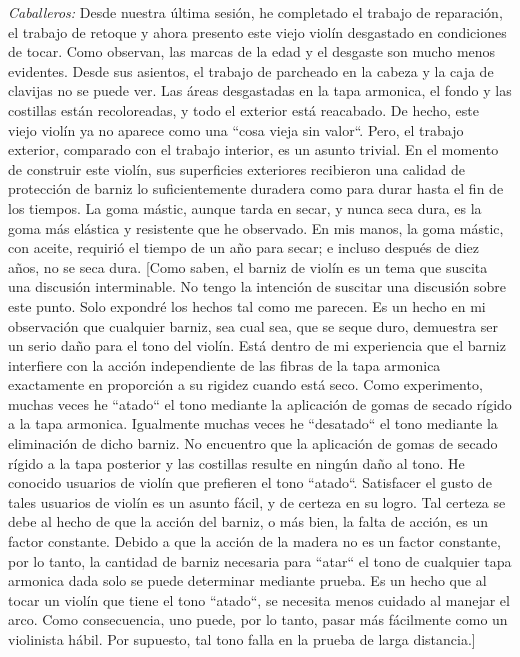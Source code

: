 \documentclass[12pt]{book}
\begin{document}
\textit{Caballeros:} Desde nuestra última sesión, he completado el trabajo de reparación, el trabajo de retoque y ahora presento este viejo violín desgastado en condiciones de tocar. Como observan, las marcas de la edad y el desgaste son mucho menos evidentes. Desde sus asientos, el trabajo de parcheado en la cabeza y la caja de clavijas no se puede ver. Las áreas desgastadas en la tapa armonica, el fondo y las costillas están recoloreadas, y todo el exterior está reacabado. De hecho, este viejo violín ya no aparece como una ``cosa vieja sin valor``. Pero, el trabajo exterior, comparado con el trabajo interior, es un asunto trivial. En el momento de construir este violín, sus superficies exteriores recibieron una calidad de protección de barniz lo suficientemente duradera como para durar hasta el fin de los tiempos. La goma mástic, aunque tarda en secar, y nunca seca dura, es la goma más elástica y resistente que he observado. En mis manos, la goma mástic, con aceite, requirió el tiempo de un año para secar; e incluso después de diez años, no se seca dura. [Como saben, el barniz de violín es un tema que suscita una discusión interminable. No tengo la intención de suscitar una discusión sobre este punto. Solo expondré los hechos tal como me parecen. Es un hecho en mi observación que cualquier barniz, sea cual sea, que se seque duro, demuestra ser un serio daño para el tono del violín. Está dentro de mi experiencia que el barniz interfiere con la acción independiente de las fibras de la tapa armonica exactamente en proporción a su rigidez cuando está seco. Como experimento, muchas veces he ``atado`` el tono mediante la aplicación de gomas de secado rígido a la tapa armonica. Igualmente muchas veces he ``desatado`` el tono mediante la eliminación de dicho barniz. No encuentro que la aplicación de gomas de secado rígido a la tapa posterior y las costillas resulte en ningún daño al tono. He conocido usuarios de violín que prefieren el tono ``atado``. Satisfacer el gusto de tales usuarios de violín es un asunto fácil, y de certeza en su logro. Tal certeza se debe al hecho de que la acción del barniz, o más bien, la falta de acción, es un factor constante. Debido a que la acción de la madera no es un factor constante, por lo tanto, la cantidad de barniz necesaria para ``atar`` el tono de cualquier tapa armonica dada solo se puede determinar mediante prueba. Es un hecho que al tocar un violín que tiene el tono ``atado``, se necesita menos cuidado al manejar el arco. Como consecuencia, uno puede, por lo tanto, pasar más fácilmente como un violinista hábil. Por supuesto, tal tono falla en la prueba de larga distancia.]
\end{document}
